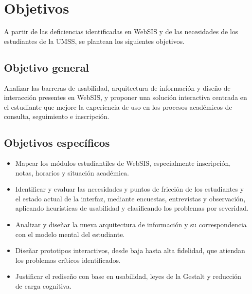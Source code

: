 \section{Objetivos}

  A partir de las deficiencias identificadas en WebSIS y de las necesidades de los estudiantes de la UMSS, se plantean los siguientes objetivos.

  \subsection{Objetivo general}

    Analizar las barreras de usabilidad, arquitectura de información y diseño de interacción presentes en WebSIS, y proponer una solución interactiva centrada en el estudiante que mejore la experiencia de uso en los procesos académicos de consulta, seguimiento e inscripción.

  \subsection{Objetivos específicos}

    \begin{itemize}
      \item Mapear los módulos estudiantiles de WebSIS, especialmente inscripción, notas, horarios y situación académica.

      \item Identificar y evaluar las necesidades y puntos de fricción de los estudiantes y  el estado actual de la interfaz, mediante encuestas, entrevistas y observación, aplicando heurísticas de usabilidad y clasificando los problemas por severidad.

      \item Analizar y diseñar la nueva arquitectura de información y su correspondencia con el modelo mental del estudiante.

      \item Diseñar prototipos interactivos, desde baja hasta alta fidelidad, que atiendan los problemas críticos identificados.

      \item Justificar el rediseño con base en usabilidad, leyes de la Gestalt y reducción de carga cognitiva.
    \end{itemize}

